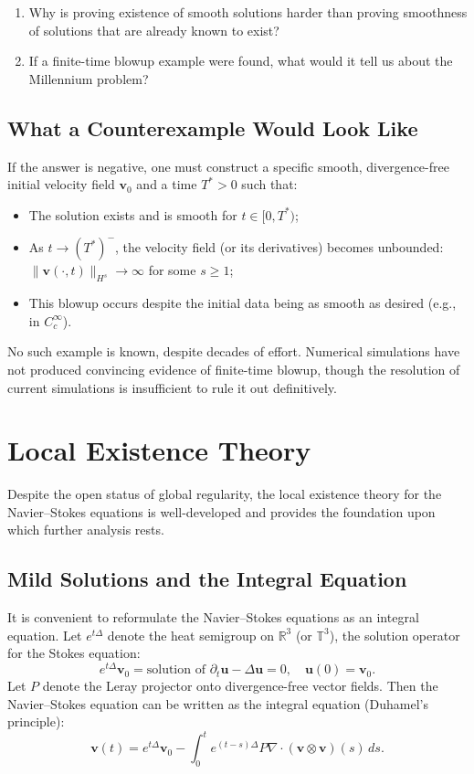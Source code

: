 \begin{checkyou}
\begin{enumerate}
\item Why is proving existence of smooth solutions harder than proving smoothness of solutions that are already known to exist?
\item If a finite-time blowup example were found, what would it tell us about the Millennium problem?
\end{enumerate}
\end{checkyou}

\subsection{What a Counterexample Would Look Like}

If the answer is negative, one must construct a specific smooth, divergence-free initial velocity field $\mathbf{v}_0$ and a time $T^* > 0$ such that:
\begin{itemize}
\item The solution exists and is smooth for $t \in [0, T^*)$;
\item As $t \to (T^*)^-$, the velocity field (or its derivatives) becomes unbounded: $\|\mathbf{v}(\cdot, t)\|_{H^s} \to \infty$ for some $s \ge 1$;
\item This blowup occurs despite the initial data being as smooth as desired (e.g., in $C_c^\infty$).
\end{itemize}

No such example is known, despite decades of effort. Numerical simulations have not produced convincing evidence of finite-time blowup, though the resolution of current simulations is insufficient to rule it out definitively.

\section{Local Existence Theory}
\label{sec:NS-local}

Despite the open status of global regularity, the local existence theory for the Navier--Stokes equations is well-developed and provides the foundation upon which further analysis rests.

\subsection{Mild Solutions and the Integral Equation}

It is convenient to reformulate the Navier--Stokes equations as an integral equation. Let $e^{t\Delta}$ denote the heat semigroup on $\mathbb{R}^3$ (or $\mathbb{T}^3$), the solution operator for the Stokes equation:
\[
e^{t\Delta} \mathbf{v}_0 = \text{solution of } \partial_t \mathbf{u} - \Delta \mathbf{u} = 0, \quad \mathbf{u}(0) = \mathbf{v}_0.
\]
Let $P$ denote the Leray projector onto divergence-free vector fields. Then the Navier--Stokes equation can be written as the integral equation (Duhamel's principle):
\begin{equation}
\label{eq:mild}
\mathbf{v}(t) = e^{t\Delta} \mathbf{v}_0 - \int_0^t e^{(t-s)\Delta} P \nabla \cdot (\mathbf{v} \otimes \mathbf{v})(s) \, ds.
\end{equation}

